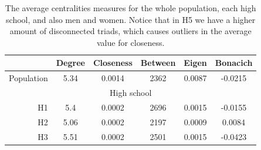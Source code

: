 \label{figure:networksHS}
\begin{table}[h!]
    \centering
    \caption{The average centralities measures for the whole population, each high school, and also men and women. Notice that in H5 we have a higher amount of disconnected triads, which causes outliers in the average value for closeness.}
    \renewcommand{\arraystretch}{1.7}
    \begin{tabular}{rccccc|}
    \cline{2-6}
    \multicolumn{1}{l|}{}                                    & \multicolumn{1}{l}{\cellcolor[HTML]{FFFFC7}Degree} & \multicolumn{1}{l}{\cellcolor[HTML]{FFFFC7}Closeness} & \multicolumn{1}{l}{\cellcolor[HTML]{FFFFC7}Between} & \multicolumn{1}{l}{\cellcolor[HTML]{FFFFC7}Eigen} & \multicolumn{1}{l|}{\cellcolor[HTML]{FFFFC7}Bonacich} \\ \hline
    \multicolumn{1}{|l|}{\cellcolor[HTML]{FBDBB5}Population} & 5.34                                               & 0.0014                                                & 2362                                                & 0.0087                                            & -0.0215                                               \\ \hline
    \multicolumn{6}{|c|}{\cellcolor[HTML]{C0C0C0}High school}                                                                                                                                                                                                                                                                               \\ \hline
    \multicolumn{1}{|r|}{\cellcolor[HTML]{EFEFEF}H1}         & 5.4                                                & 0.0002                                                & 2696                                                & 0.0015                                            & -0.0155                                               \\
    \multicolumn{1}{|r|}{\cellcolor[HTML]{EFEFEF}H2}         & 5.06                                               & 0.0002                                                & 2197                                                & 0.0009                                            & 0.0084                                                \\
    \multicolumn{1}{|r|}{\cellcolor[HTML]{EFEFEF}H3}         & 5.51                                               & 0.0002                                                & 2501                                                & 0.0015                                            & -0.0423                                               \\

\end{tabular}
\end{table}
